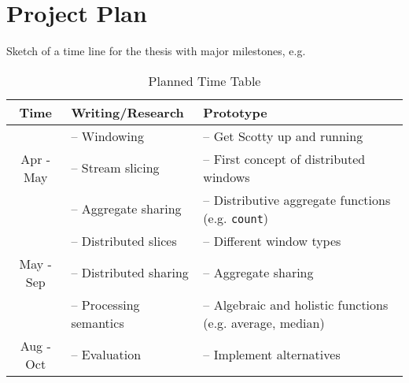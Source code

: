 \section{Project Plan}
\label{sec:plan}

Sketch of a time line for the thesis with major milestones, e.g.

\begin{table}[h!]
    \centering
    \begin{tabular}{ | c | m{} | m{} | }
        \hline
        \textbf{Time} & \textbf{Writing/Research} & \textbf{Prototype} \\
        \hline
                  & -- Windowing         & -- Get Scotty up and running\\
        Apr - May & -- Stream slicing    & -- First concept of distributed windows\\
                  & -- Aggregate sharing & -- Distributive aggregate functions (e.g. \texttt{count})\\
        \hline
                  & -- Distributed slices   & -- Different window types\\
        May - Sep & -- Distributed sharing  & -- Aggregate sharing\\
                  & -- Processing semantics & -- Algebraic and holistic functions (e.g. average, median)\\
        \hline
        Aug - Oct & -- Evaluation & -- Implement alternatives \\
        \hline
    \end{tabular}
    \label{tab:time-table}
    \caption{Planned Time Table}
\end{table}